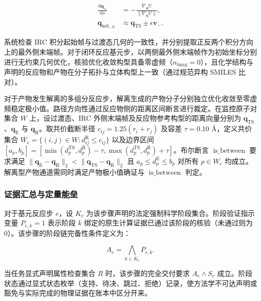 \begin{equation}\label{eq:methods-12}
\begin{aligned}
\frac{\mathrm{d}\mathbf{q}_{\pm}}{\mathrm{d}s}&=-\frac{\nabla_{\mathbf{q}}U}{\|\nabla_{\mathbf{q}}U\|},\\
\mathbf{q}_{\mathrm{init},\pm}&\approx\mathbf{q}_{\mathrm{TS}}\pm\epsilon\mathbf{v}_-.
\end{aligned}
\end{equation}

系统检查 IRC 积分起始帧与过渡态几何的一致性，并分别提取正反两个积分方向上的最外侧末端帧。对于闭环反应基元步，以两侧最外侧末端帧作为初始坐标分别进行无约束几何优化，核验优化收敛构型具备零虚频（$n_{\mathrm{imag}}=0$），且化学结构与声明的反应物和产物在分子拓扑与立体构型上一致（通过规范异构 SMILES 比对）。

对于产物发生解离的多组分反应步，解离生成的产物分子分别独立优化收敛至零虚频稳定极小值。路径方向性通过反应物侧的距离区间断言进行裁定。在监控原子对集合 $W$ 上，设过渡态、IRC 外侧末端帧及反应物参考构型的距离向量分别为 $\mathbf{q}_{\mathrm{TS}}$、$\mathbf{q}_{\mathrm{E}}$ 与 $\mathbf{q}_{\mathrm{R}}$。取共价截断半径 $c_{ij}=1.25(r_i+r_j)$ 及容差 $\tau=0.10$ Å，定义共价集合 $W_{\mathrm{c}}=\{(i,j)\in W:d_{ij}^{\mathrm{R}}\le c_{ij}\}$ 以及边界区间 $[a_p,b_p]=[\min(d_p^{\mathrm{TS}},d_p^{\mathrm{R}})-\tau, \max(d_p^{\mathrm{TS}},d_p^{\mathrm{R}})+\tau]$。布尔断言 $\operatorname{is\_between}$ 要求满足 $\|\mathbf{q}_{\mathrm{E}}-\mathbf{q}_{\mathrm{R}}\|_2<\|\mathbf{q}_{\mathrm{TS}}-\mathbf{q}_{\mathrm{R}}\|_2$ 且 $a_p\le d_p^{\mathrm{E}}\le b_p$ 对所有 $p\in W_{\mathrm{c}}$ 均成立。解离型产物通道需同时满足产物极小值确证与 $\operatorname{is\_between}$ 判定。

\subsubsection{证据汇总与定量能垒}
对于基元反应步 $e$，设 $K_e$ 为该步骤声明的法定强制科学阶段集合。阶段验证指示变量 $P_{e,k}=1$ 表示阶段 $k$ 绑定的原生计算证据已通过该阶段的核验（未通过则为 0）。该步骤的阶段链完备性条件定义为：

\begin{equation}\label{eq:methods-13}
A_e=\bigwedge_{k\in K_e}P_{e,k}.
\end{equation}

当任务显式声明属性检查集合 $R$ 时，该步骤的完全交付要求 $A_e\wedge S_e$ 成立。阶段状态通过显式状态枚举（支持、待决、跳过、拒绝）记录，使方法学不可达声明或豁免与实际完成的物理证据在账本中区分开来。

